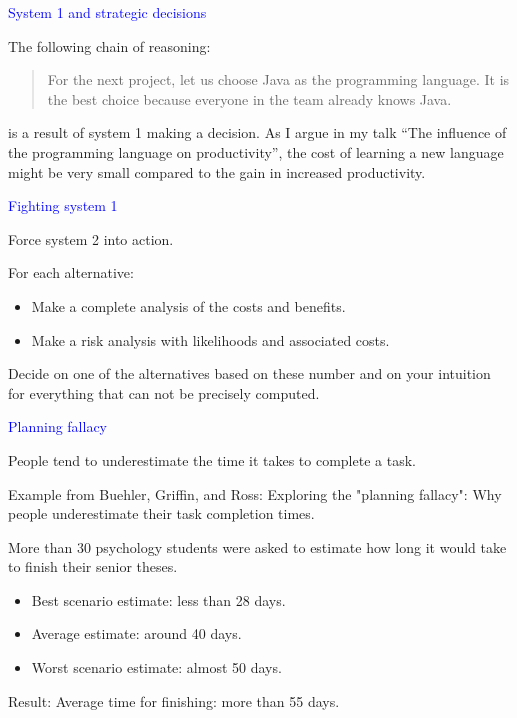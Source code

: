 \documentclass{slides}
\newcommand{\ti}[1]{\begin{center}\Large{\textcolor{blue}{#1}}\end{center}}
\begin{document}
\begin{slide}\ti{System 1 and strategic decisions}

The following chain of reasoning:

\begin{quotation}
For the next project, let us choose Java as the programming language.
It is the best choice because everyone in the team already knows
Java.
\end{quotation}

is a result of system 1 making a decision.  As I argue in my talk
``The influence of the programming language on productivity'', the
cost of learning a new language might be very small compared to the
gain in increased productivity.
\vfill\end{slide}
\begin{slide}\ti{Fighting system 1}

Force system 2 into action.

For each alternative:

\begin{itemize}
\item Make a complete analysis of the costs and benefits.
\item Make a risk analysis with likelihoods and associated costs.
\end{itemize}

Decide on one of the alternatives based on these number and on your
intuition for everything that can not be precisely computed.

\vfill\end{slide}
\begin{slide}\ti{Planning fallacy}

People tend to underestimate the time it takes to complete a task.

Example from Buehler, Griffin, and Ross: Exploring the "planning
fallacy": Why people underestimate their task completion times.

More than 30 psychology students were asked to estimate how long it
would take to finish their senior theses.

\begin{itemize}
\item Best scenario estimate: less than 28 days.
\item Average estimate: around 40 days.
\item Worst scenario estimate: almost 50 days.
\end{itemize}

Result: Average time for finishing: more than 55 days.

\vfill\end{slide}
\end{document}
